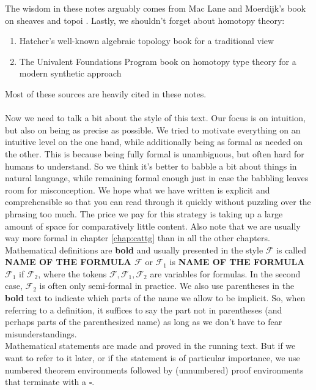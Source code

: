 The {\glqq}wisdom{\grqq} in these notes arguably comes from Mac Lane and Moerdijk's book on sheaves and topoi \cite{c55c71e8}.
Lastly, we shouldn't forget about homotopy theory:
\begin{enumerate}
\item[$\bullet$]
Hatcher's well-known algebraic topology book \cite{8b5861fc} for a traditional view
\item[$\bullet$]
The Univalent Foundations Program book on homotopy type theory \cite{1ba1603e} for a modern synthetic approach
\end{enumerate}
Most of these sources are heavily cited in these notes.
\\\\
Now we need to talk a bit about the style of this text.
Our focus is on intuition, but also on being as precise as possible.
We tried to motivate everything on an intuitive level on the one hand, while additionally being as formal as needed on the other.
This is because being fully formal is unambiguous, but often hard for humans to understand.
So we think it's better to babble a bit about things in natural language, while remaining formal enough just in case the babbling leaves room for misconception.
We hope what we have written is explicit and comprehensible so that you can read through it quickly without puzzling over the phrasing too much.
The price we pay for this strategy is taking up a large amount of space for comparatively little content.
Also note that we are usually way more formal in chapter \ref{chap:cattg} than in all the other chapters.
\\
Mathematical definitions are \textbf{bold} and usually presented in the style {\glqq}$\mathcal{F}$ is called \textbf{NAME OF THE FORMULA $\mathcal{F}$}{\grqq} or {\glqq}$\mathcal{F}_{1}$ is \textbf{NAME OF THE FORMULA $\mathcal{F}_{1}$} if $\mathcal{F}_{2}${\grqq}, where the tokens $\mathcal{F},\mathcal{F}_{1},\mathcal{F}_{2}$ are variables for formulas.
In the second case, $\mathcal{F}_{2}$ is often only semi-formal in practice.
We also use parentheses in the \textbf{bold} text to indicate which parts of the name we allow to be implicit.
So, when referring to a definition, it suffices to say the part not in parentheses (and perhaps parts of the parenthesized name) as long as we don't have to fear misunderstandings.
\\
Mathematical statements are made and proved in the running text.
But if we want to refer to it later, or if the statement is of particular importance, we use numbered theorem environments followed by (unnumbered) proof environments that terminate with a $\square$.
